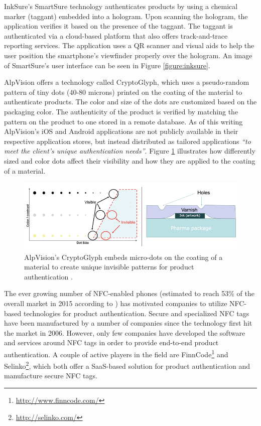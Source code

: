\documentclass[thesis.tex]{subfiles}
\begin{document}
InkSure's SmartSure technology authenticates products by using a chemical marker (taggant) embedded into a hologram. Upon scanning the hologram, the application verifies it based on the presence of the taggant. The taggant is authenticated via a cloud-based platform that also offers track-and-trace reporting services. The application uses a QR scanner and visual aids to help the user position the smartphone's viewfinder properly over the hologram. \cite{inksure} An image of SmartSure's user interface can be seen in Figure \ref{figure:inksure}.

AlpVision offers a technology called CryptoGlyph\textregistered, which uses a pseudo-random pattern of tiny dots (40-80 microns) printed on the coating of the material to authenticate products. The color and size of the dots are customized based on the packaging color. The authenticity of the product is verified by matching the pattern on the product to one stored in a remote database. As of this writing AlpVision's iOS and Android applications are not publicly available in their respective application stores, but instead distributed as tailored applications \textit{``to meet the client's unique authentication needs''}. \cite{alpvision} Figure \ref{figure:alpvision} illustrates how differently sized and color dots affect their visibility and how they are applied to the coating of a material.

\begin{figure}[hb]
\centering \includegraphics[width=13.25cm]{images/existing_solutions/cryptoglyph}
\caption{AlpVision's CryptoGlyph\textregistered{} embeds micro-dots on the coating of a material to create unique invisible patterns for product authentication \cite{alpvision}. \label{figure:alpvision}}
\end{figure}

The ever growing number of NFC-enabled phones (estimated to reach 53\% of the overall market in 2015 according to \cite{frost-sullivan}) has motivated companies to utilize NFC-based technologies for product authentication. Secure and specialized NFC tags have been manufactured by a number of companies since the technology first hit the market in 2006. However, only few companies have developed the software and services around NFC tags in order to provide end-to-end product authentication. A couple of active players in the field are FinnCode\footnote{\url{http://www.finncode.com/}} and Selinko\footnote{\url{http://selinko.com/}}, which both offer a SaaS-based solution for product authentication and manufacture secure NFC tags.
\end{document}
